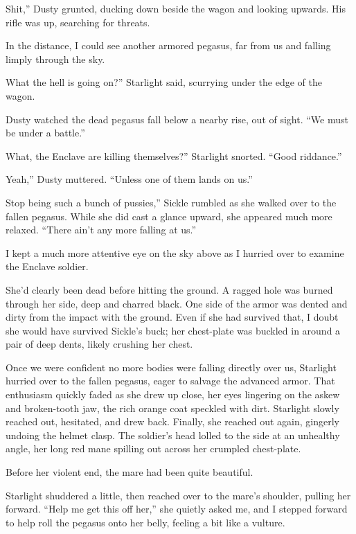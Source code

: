 \leavevmode{}Shit,” Dusty grunted, ducking down beside the wagon and looking upwards. His rifle was up, searching for threats.

In the distance, I could see another armored pegasus, far from us and falling limply through the sky.

\leavevmode{}What the hell is going on?” Starlight said, scurrying under the edge of the wagon.

Dusty watched the dead pegasus fall below a nearby rise, out of sight. “We must be under a battle.”

\leavevmode{}What, the Enclave are killing themselves?” Starlight snorted. “Good riddance.”

\leavevmode{}Yeah,” Dusty muttered. “Unless one of them lands on us.”

\leavevmode{}Stop being such a bunch of pussies,” Sickle rumbled as she walked over to the fallen pegasus. While she did cast a glance upward, she appeared much more relaxed. “There ain’t any more falling at us.”

I kept a much more attentive eye on the sky above as I hurried over to examine the Enclave soldier.

She’d clearly been dead before hitting the ground. A ragged hole was burned through her side, deep and charred black. One side of the armor was dented and dirty from the impact with the ground. Even if she had survived that, I doubt she would have survived Sickle’s buck; her chest-plate was buckled in around a pair of deep dents, likely crushing her chest.

Once we were confident no more bodies were falling directly over us, Starlight hurried over to the fallen pegasus, eager to salvage the advanced armor. That enthusiasm quickly faded as she drew up close, her eyes lingering on the askew and broken-tooth jaw, the rich orange coat speckled with dirt. Starlight slowly reached out, hesitated, and drew back. Finally, she reached out again, gingerly undoing the helmet clasp. The soldier’s head lolled to the side at an unhealthy angle, her long red mane spilling out across her crumpled chest-plate.

Before her violent end, the mare had been quite beautiful.

Starlight shuddered a little, then reached over to the mare’s shoulder, pulling her forward. “Help me get this off her,” she quietly asked me, and I stepped forward to help roll the pegasus onto her belly, feeling a bit like a vulture.

